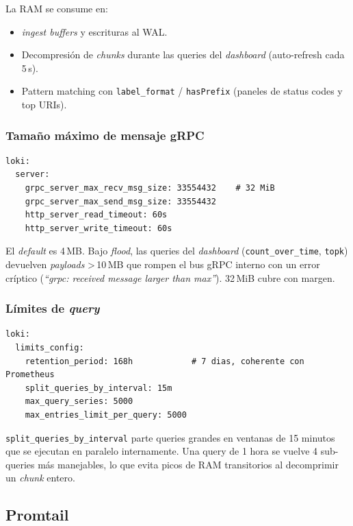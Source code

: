 La RAM se consume en:
\begin{itemize}
  \item \emph{ingest buffers} y escrituras al WAL.
  \item Decompresión de \emph{chunks} durante las queries del \emph{dashboard} (auto-refresh cada 5\,s).
  \item Pattern matching con \texttt{label\_format} / \texttt{hasPrefix} (paneles de status codes y top URIs).
\end{itemize}

\subsubsection{Tamaño máximo de mensaje gRPC}

\begin{lstlisting}[style=yaml]
loki:
  server:
    grpc_server_max_recv_msg_size: 33554432    # 32 MiB
    grpc_server_max_send_msg_size: 33554432
    http_server_read_timeout: 60s
    http_server_write_timeout: 60s
\end{lstlisting}

El \emph{default} es 4\,MB. Bajo \emph{flood}, las queries del \emph{dashboard} (\texttt{count\_over\_time}, \texttt{topk}) devuelven \emph{payloads} \textgreater\,10\,MB que rompen el bus gRPC interno con un error críptico (\emph{``grpc: received message larger than max''}). 32\,MiB cubre con margen.

\subsubsection{Límites de \emph{query}}

\begin{lstlisting}[style=yaml]
loki:
  limits_config:
    retention_period: 168h            # 7 dias, coherente con Prometheus
    split_queries_by_interval: 15m
    max_query_series: 5000
    max_entries_limit_per_query: 5000
\end{lstlisting}

\texttt{split\_queries\_by\_interval} parte queries grandes en ventanas de 15 minutos que se ejecutan en paralelo internamente. Una query de 1 hora se vuelve 4 sub-queries más manejables, lo que evita picos de RAM transitorios al decomprimir un \emph{chunk} entero.

\subsection{Promtail}

